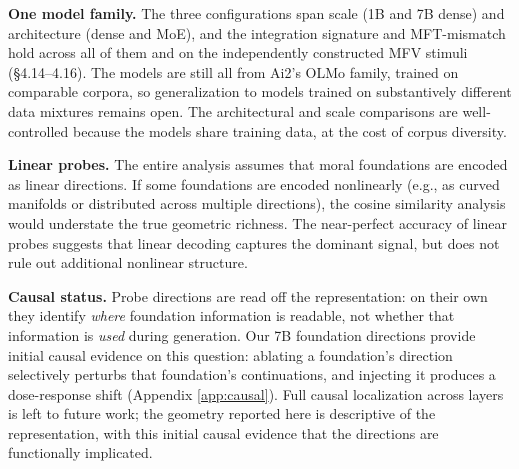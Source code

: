 \textbf{One model family.} The three configurations span scale (1B and 7B
dense) and architecture (dense and MoE), and the integration signature
and MFT-mismatch hold across all of them and on the independently
constructed MFV stimuli (\S4.14--4.16). The models are still all from
Ai2's OLMo family, trained on comparable corpora, so generalization to
models trained on substantively different data mixtures remains open.
The architectural and scale comparisons are well-controlled because
the models share training data, at the cost of corpus diversity.

\textbf{Linear probes.} The entire analysis assumes that moral
foundations are encoded as linear directions. If some foundations
are encoded nonlinearly (e.g., as curved manifolds or distributed
across multiple directions), the cosine similarity analysis
would understate the true geometric richness. The near-perfect
accuracy of linear probes suggests that linear decoding captures
the dominant signal, but does not rule out additional nonlinear
structure.

\textbf{Causal status.} Probe directions are read off the representation:
on their own they identify \emph{where} foundation information is readable,
not whether that information is \emph{used} during generation. Our 7B
foundation directions provide initial causal evidence on this
question: ablating a foundation's direction selectively perturbs that
foundation's continuations, and injecting it produces a dose-response
shift (Appendix \ref{app:causal}). Full causal localization across
layers is left to future work; the geometry reported here is
descriptive of the representation, with this initial causal evidence
that the directions are functionally implicated.

